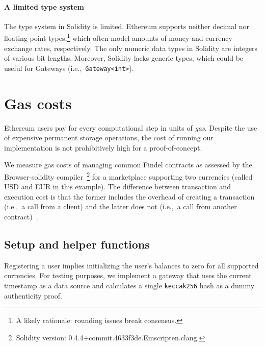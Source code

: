 \paragraph{A limited type system}
The type system in Solidity is limited.
Ethereum supports neither decimal nor floating-point types,\footnote{A likely rationale: rounding issues break consensus.} which often model amounts of money and currency exchange rates, respectively.
The only numeric data types in Solidity are integers of various bit lengths.
Moreover, Solidity lacks generic types, which could be useful for Gateways (i.e.,~\texttt{Gateway<int>}).


\section{Gas costs} \label{sec:Ch10FindelTesting}

Ethereum users pay for every computational step in units of \textit{gas}.
Despite the use of expensive permanent storage operations, the cost of running our implementation is not prohibitively high for a proof-of-concept.

We measure gas costs of managing common Findel contracts as assessed by the Browser-solidity compiler~\cite{BrowserSolidity}\footnote{Solidity version: 0.4.4+commit.4633f3de.Emscripten.clang.} for a marketplace supporting two currencies (called USD and EUR in this example).
The difference between transaction and execution cost is that the former includes the overhead of creating a transaction (i.e.,~a call from a client) and the latter does not (i.e.,~a call from another contract)~\cite{Revere2016}.

\subsection{Setup and helper functions}

Registering a user implies initializing the user's balances to zero for all supported currencies.
For testing purposes, we implement a gateway that uses the current timestamp as a data source and calculates a single \texttt{keccak256} hash as a dummy authenticity proof.


